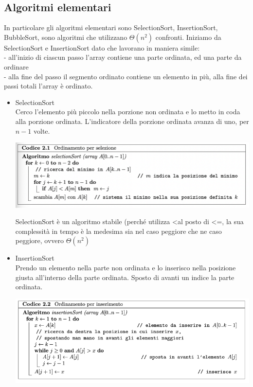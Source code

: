 \documentclass[11pt, oneside]{article}   	%
\begin{document}
\subsection{Algoritmi elementari}
In particolare gli algoritmi elementari sono SelectionSort, InsertionSort, BubbleSort, sono algoritmi che utilizzano $\Theta(n^2)$ confronti.
Iniziamo da SelectionSort e InsertionSort dato che lavorano in maniera simile:\\
- all'inizio di ciascun passo l'array contiene una parte ordinata, ed una parte da ordinare\\
- alla fine del passo il segmento ordinato contiene un elemento in più, alla fine dei passi totali l'array è ordinato.
\begin{itemize}
\item SelectionSort\\
Cerco l'elemento più piccolo nella porzione non ordinata e lo metto in coda alla porzione ordinata. L'indicatore della porzione ordinata avanza di uno, per $n-1$ volte.
\begin{center}
\includegraphics[scale=0.8]{selSort}
\end{center}
SelectionSort è un algoritmo stabile (perché utilizza \textless al posto di \textless=, la sua complessità in tempo è la medesima sia nel caso peggiore che ne caso peggiore, ovvero $\Theta(n^2)$
\item InsertionSort\\
Prendo un elemento nella parte non ordinata e lo inserisco nella posizione giusta all'interno della parte ordinata. Sposto di avanti un indice la parte ordinata.
\begin{center}
\includegraphics[scale=0.8]{insort}

\end{center}
\end{itemize}
\end{document}
